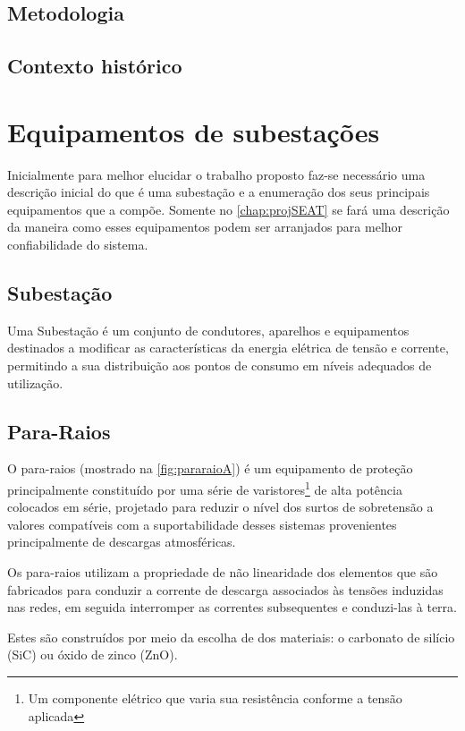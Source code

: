 	\section{Metodologia}
	\textcolor{red}{\lipsum[1-2]}

	\section{Contexto histórico}
		



\chapter{Equipamentos de subestações}
	\label{chap:equipSE}
	Inicialmente para melhor elucidar o trabalho proposto faz-se necessário uma descrição inicial do que é uma subestação e a enumeração dos seus principais equipamentos que a compõe. Somente no \autoref{chap:projSEAT} se fará uma descrição da maneira como esses equipamentos podem ser arranjados para melhor confiabilidade do sistema.
	\section*{Subestação}
	Uma Subestação é um conjunto de condutores, aparelhos e equipamentos destinados a modificar as características da energia elétrica de tensão e corrente, permitindo a sua distribuição aos pontos de consumo em níveis adequados de utilização.\cite{instElet}

	\section{Para-Raios}
		O para-raios (mostrado na \autoref{fig:pararaioA}) é um equipamento de proteção principalmente constituído por uma série de varistores\footnote{Um componente elétrico que varia sua resistência conforme a tensão aplicada\cite[p. 413]{BellSytemHistory}} de alta potência colocados em série, projetado para reduzir o nível dos surtos de sobretensão a valores compatíveis com a suportabilidade desses sistemas provenientes principalmente de descargas atmosféricas.\par
		Os para-raios utilizam a propriedade de não linearidade dos elementos que são fabricados para conduzir a corrente de descarga associados às tensões induzidas nas redes, em seguida interromper as correntes subsequentes e conduzi-las à terra.\par
		Estes são construídos por meio da escolha de dos materiais: o carbonato de silício (SiC) ou óxido de zinco (ZnO). 

